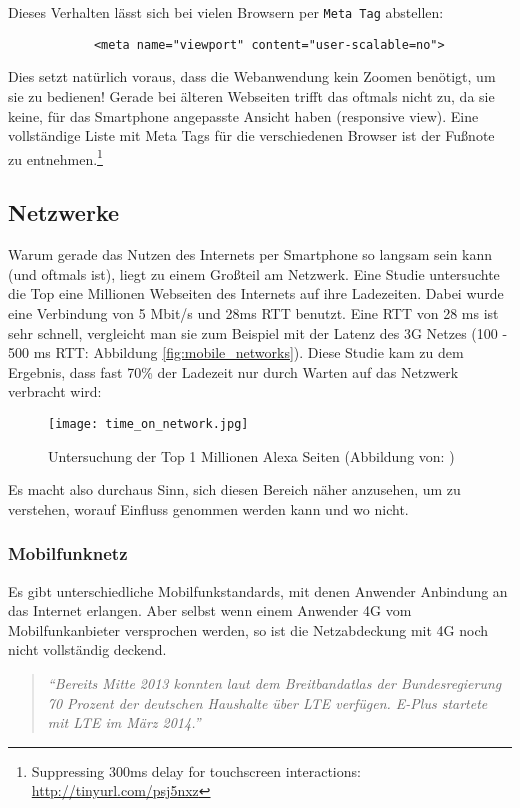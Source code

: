 		Dieses Verhalten lässt sich bei vielen Browsern per \texttt{Meta Tag} abstellen:

		\begin{lstlisting}
			<meta name="viewport" content="user-scalable=no">
		\end{lstlisting}

		Dies setzt natürlich voraus, dass die Webanwendung kein Zoomen benötigt, um sie zu bedienen! Gerade bei älteren Webseiten trifft das oftmals nicht zu, da sie keine, für das Smartphone angepasste Ansicht haben (responsive view). Eine vollständige Liste mit Meta Tags für die verschiedenen Browser ist der Fußnote zu entnehmen.\footnote{Suppressing 300ms delay for touchscreen interactions: \url{http://tinyurl.com/psj5nxz}}


	\subsection{Netzwerke} %
	\label{sub:netzwerke}
		Warum gerade das Nutzen des Internets per Smartphone so langsam sein kann (und oftmals ist), liegt zu einem Großteil am Netzwerk. Eine Studie untersuchte die Top eine Millionen Webseiten des Internets auf ihre Ladezeiten. Dabei wurde eine Verbindung von 5 Mbit/s und 28ms RTT benutzt. Eine RTT von 28 ms ist sehr schnell, vergleicht man sie zum Beispiel mit der Latenz des 3G Netzes (100 - 500 ms RTT: Abbildung \ref{fig:mobile_networks}). Diese Studie kam zu dem Ergebnis, dass fast 70\% der Ladezeit nur durch Warten auf das Netzwerk verbracht wird:

		\begin{figure}[htbp]
			\begin{center}
				\texttt{[image: time\_on\_network.jpg]}
				\caption{Untersuchung der Top 1 Millionen Alexa Seiten (Abbildung von: \autocite{alexa})}
				\label{fig:time_on_network}
			\end{center}
		\end{figure}

		Es macht also durchaus Sinn, sich diesen Bereich näher anzusehen, um zu verstehen, worauf Einfluss genommen werden kann und wo nicht.

		\subsubsection{Mobilfunknetz} %
		\label{ssub:Mobilfunknetz}
			Es gibt unterschiedliche Mobilfunkstandards, mit denen Anwender Anbindung an das Internet erlangen. Aber selbst wenn einem Anwender 4G vom Mobilfunkanbieter versprochen werden, so ist die Netzabdeckung mit 4G noch nicht vollständig deckend.
			\begin{quote}
				\textit{"`Bereits Mitte 2013 konnten laut dem Breitbandatlas der Bundesregierung 70 Prozent der deutschen Haushalte über LTE verfügen. E-Plus startete mit LTE im März 2014."' \autocite{netzagentur}}
			\end{quote}

